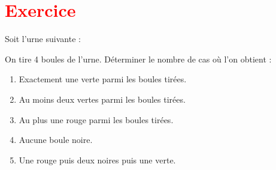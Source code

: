 \documentclass[a4paper,12pt]{article}
\begin{document}
\section*{\textcolor{red}{Exercice}}

Soit l'urne suivante :

\begin{center}
\end{center}

On tire 4 boules de l'urne. Déterminer le nombre de cas où l'on obtient :

\begin{enumerate}[label=\textcolor{blue}{\textbf{\arabic*.}}]
    \item Exactement une verte parmi les boules tirées.
    \item Au moins deux vertes parmi les boules tirées.
    \item Au plus une rouge parmi les boules tirées.
    \item Aucune boule noire.
    \item Une rouge puis deux noires puis une verte.
\end{enumerate}
\end{document}
